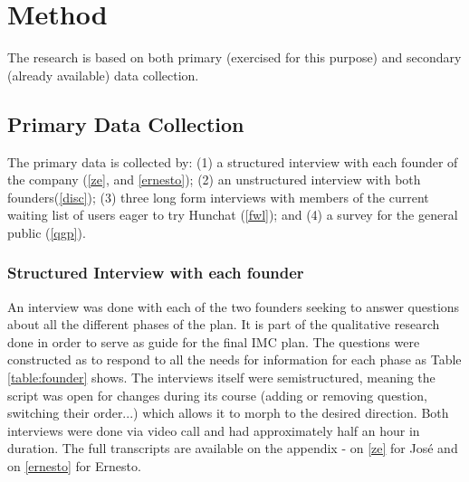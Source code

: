 \documentclass[12pt]{article}
\begin{document}
\section{Method}\label{method}
The research is based on both primary (exercised for this purpose) and secondary (already available) data collection. 

\subsection{Primary Data Collection}
The primary data is collected by: (1) a structured interview with each founder of the company (\ref{ze}, and \ref{ernesto}); (2) an unstructured interview with both founders(\ref{disc}); (3) three long form interviews with members of the current waiting list of users eager to try Hunchat (\ref{fwl}); and (4) a survey for the general public (\ref{qgp}). 

\subsubsection{Structured Interview with each founder}
An interview was done with each of the two founders seeking to answer questions about all the different phases of the plan. It is part of the qualitative research done in order to serve as guide for the final IMC plan. The questions were constructed as to respond to all the needs for information for each phase as Table \ref{table:founder} shows. The interviews itself were semistructured, meaning the script was open for changes during its course (adding or removing question, switching their order...) which allows it to morph to the desired direction. Both interviews were done via video call and had approximately half an hour in duration. The full transcripts are available on the appendix - on \ref{ze} for José and on \ref{ernesto} for Ernesto. 
\end{document}
